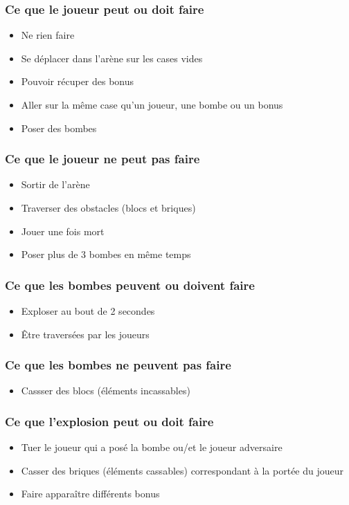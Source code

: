 \documentclass[a4paper,11pt,french]{article}
\begin{document}
\subsubsection{Ce que le joueur peut ou doit faire}
\begin{itemize}
\item Ne rien faire
\item Se déplacer dans l'arène sur les cases vides
\item Pouvoir récuper des bonus
\item Aller sur la même case qu'un joueur, une bombe ou un bonus
\item Poser des bombes
\end{itemize}
\subsubsection{Ce que le joueur ne peut pas faire}
\begin{itemize}
\item Sortir de l'arène
\item Traverser des obstacles (blocs et briques)
\item Jouer une fois mort
\item Poser plus de 3 bombes en même temps
\end{itemize}
\subsubsection{Ce que les bombes peuvent ou doivent faire}
\begin{itemize}
\item Exploser au bout de 2 secondes
\item Être traversées par les joueurs
\end{itemize}
\subsubsection{Ce que les bombes ne peuvent pas faire}
\begin{itemize}
\item Cassser des blocs (éléments incassables)
\end{itemize}
\subsubsection{Ce que l'explosion peut ou doit faire}
\begin{itemize}
\item Tuer le joueur qui a posé la bombe ou/et le joueur adversaire
\item Casser des briques (éléments cassables) correspondant à la portée du joueur
\item Faire apparaître différents bonus
\end{itemize}
\end{document}
